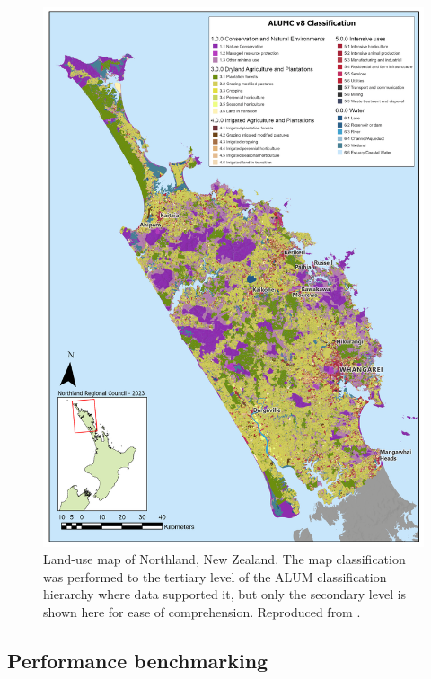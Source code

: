 \documentclass[]{interact}
\theoremstyle{plain}%
\theoremstyle{definition}
\theoremstyle{remark}
\begin{document}
\begin{figure}[t]
    \centering
    \includegraphics[width=1\linewidth]{images/NRC_ALUM.png}
    \caption{Land-use map of Northland, New Zealand. The map classification was performed to the tertiary level of the \ac{ALUM} classification hierarchy where data supported it, but only the secondary level is shown here for ease of comprehension. Reproduced from \citet{law2023}.}
    \label{fig:NRC-ALUM}
\end{figure}

\subsection{Performance benchmarking}
\end{document}
